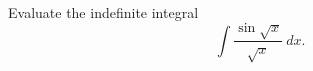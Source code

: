 \documentclass[letterpaper,11pt]{article}
\begin{document}
Evaluate the indefinite integral
\[\int \frac{\sin{\sqrt{x}}}{\sqrt{x}} \ dx.\]
\end{document}
